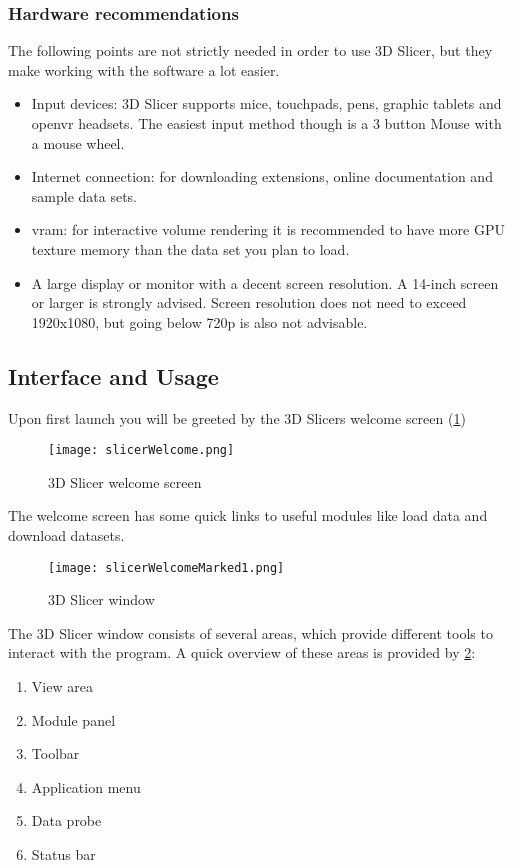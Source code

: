\subsubsection{Hardware recommendations}
The following points are not strictly needed in order to use 3D Slicer, but they make working with the software a lot easier.
\begin{itemize}
	\item Input devices: 3D Slicer supports mice, touchpads, pens, graphic tablets and \gls{openvr} headsets. The easiest input method though is a 3 button Mouse with a mouse wheel.
	\item Internet connection: for downloading extensions, online documentation and sample data sets.
	\item \gls{vram}: for interactive volume rendering it is recommended to have more GPU texture memory than the data set you plan to load.
	\item A large display or monitor with a decent screen resolution. A 14-inch screen or larger is strongly advised. Screen resolution does not need to exceed 1920x1080, but going below 720p is also not advisable.
\end{itemize}


\subsection{Interface and Usage}
Upon first launch you will be greeted by the 3D Slicers welcome screen (\cref{fig:slicerWelcome})
\begin{figure}[h!] %
	\centerline{
		\texttt{[image: slicerWelcome.png]}}
	\caption{3D Slicer welcome screen}\label{fig:slicerWelcome}
\end{figure}
\noindent
The welcome screen has some quick links to useful modules like load data and download datasets.
\pagebreak
\begin{figure}[h!] %
	\centerline{ %
		\texttt{[image: slicerWelcomeMarked1.png]}}
	\caption{3D Slicer window}\label{fig:slicerView}
\end{figure}

\noindent
The 3D Slicer window consists of several areas, which provide different tools to interact with the program.
A quick overview of these areas is provided by \cref{fig:slicerView}:
\begin{enumerate}
	\item View area
	\item Module panel
	\item Toolbar
	\item Application menu
	\item Data probe
	\item Status bar
\end{enumerate}


